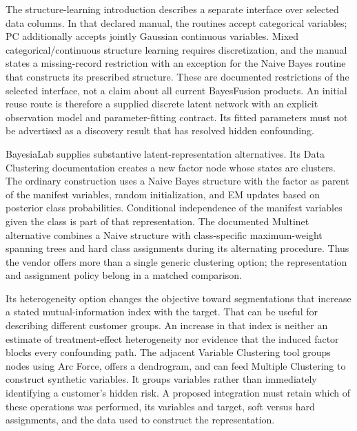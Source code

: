 The structure-learning introduction describes a separate interface over
selected data columns. In that declared manual, the routines accept
categorical variables; PC additionally accepts jointly Gaussian
continuous variables. Mixed categorical/continuous structure learning
requires discretization, and the manual states a missing-record
restriction with an exception for the Naive Bayes routine that
constructs its prescribed structure. These are documented restrictions
of the selected interface, not a claim about all current BayesFusion
products. An initial reuse route is therefore a supplied discrete latent
network with an explicit observation model and parameter-fitting
contract. Its fitted parameters must not be advertised as a discovery
result that has resolved hidden confounding.
\citep{exec13_latent_genie_structure,exec13_latent_genie_parameters}

BayesiaLab supplies substantive latent-representation alternatives. Its
Data Clustering documentation creates a new factor node whose states are
clusters. The ordinary construction uses a Naive Bayes structure with
the factor as parent of the manifest variables, random initialization,
and EM updates based on posterior class probabilities. Conditional
independence of the manifest variables given the class is part of that
representation. The documented Multinet alternative combines a Naive
structure with class-specific maximum-weight spanning trees and hard
class assignments during its alternating procedure. Thus the vendor
offers more than a single generic clustering option; the representation
and assignment policy belong in a matched comparison.
\citep{exec13_latent_bayesia_data}

Its heterogeneity option changes the objective toward segmentations that
increase a stated mutual-information index with the target. That can be
useful for describing different customer groups. An increase in that
index is neither an estimate of treatment-effect heterogeneity nor
evidence that the induced factor blocks every confounding path. The
adjacent Variable Clustering tool groups nodes using Arc Force, offers a
dendrogram, and can feed Multiple Clustering to construct synthetic
variables. It groups variables rather than immediately identifying a
customer's hidden risk. A proposed integration must retain which of
these operations was performed, its variables and target, soft versus
hard assignments, and the data used to construct the representation.
\citep{exec13_latent_bayesia_data,exec13_latent_bayesia_variables}

